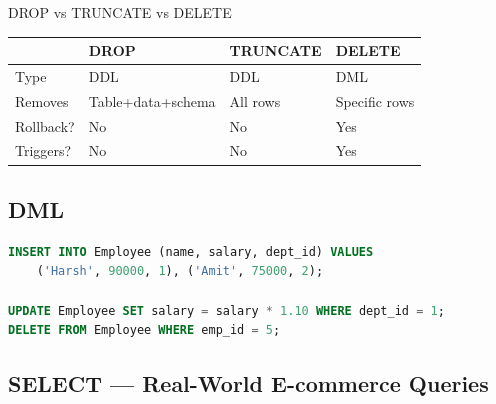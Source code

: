 \documentclass[12pt,a4paper]{article}
\begin{document}
\begin{tipbox}{DROP vs TRUNCATE vs DELETE}
\begin{center}
\begin{tabular}{@{}l l l l@{}}
\toprule
& \textbf{DROP} & \textbf{TRUNCATE} & \textbf{DELETE} \\
\midrule
Type & DDL & DDL & DML \\
Removes & Table+data+schema & All rows & Specific rows \\
Rollback? & No & No & Yes \\
Triggers? & No & No & Yes \\
\bottomrule
\end{tabular}
\end{center}
\end{tipbox}

\subsection{DML}
\begin{lstlisting}[language=SQL]
INSERT INTO Employee (name, salary, dept_id) VALUES
    ('Harsh', 90000, 1), ('Amit', 75000, 2);

UPDATE Employee SET salary = salary * 1.10 WHERE dept_id = 1;
DELETE FROM Employee WHERE emp_id = 5;
\end{lstlisting}

\subsection{SELECT --- Real-World E-commerce Queries}
\end{document}
